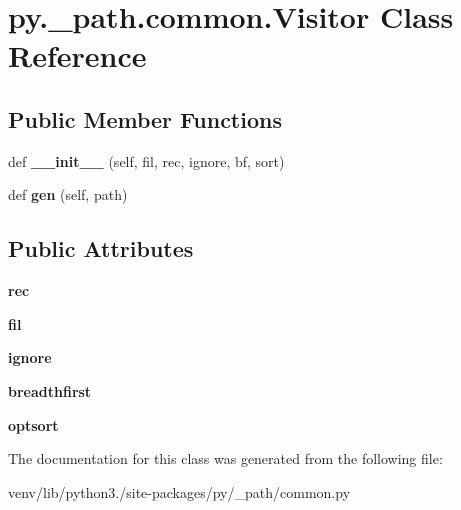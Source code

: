 \hypertarget{classpy_1_1__path_1_1common_1_1_visitor}{}\section{py.\+\_\+path.\+common.\+Visitor Class Reference}
\label{classpy_1_1__path_1_1common_1_1_visitor}
\subsection*{Public Member Functions}
\begin{DoxyCompactItemize}
\item 
\mbox{\label{classpy_1_1__path_1_1common_1_1_visitor_a28ecc230ca28f21857080714a5255c93}} 
def {\bfseries \+\_\+\+\_\+init\+\_\+\+\_\+} (self, fil, rec, ignore, bf, sort)
\item 
\mbox{\label{classpy_1_1__path_1_1common_1_1_visitor_a750a06dcf7c0d9b64a192b4e8413b35b}} 
def {\bfseries gen} (self, path)
\end{DoxyCompactItemize}
\subsection*{Public Attributes}
\begin{DoxyCompactItemize}
\item 
\mbox{\label{classpy_1_1__path_1_1common_1_1_visitor_a400ff7603fa745c659383ebf4fb107e2}} 
{\bfseries rec}
\item 
\mbox{\label{classpy_1_1__path_1_1common_1_1_visitor_a40856620ba3fdca04a1e4bb8043d99da}} 
{\bfseries fil}
\item 
\mbox{\label{classpy_1_1__path_1_1common_1_1_visitor_a6fdc0541fa34f8a365660fe90b8081cf}} 
{\bfseries ignore}
\item 
\mbox{\label{classpy_1_1__path_1_1common_1_1_visitor_ab20ab09fc6e445e833bbbd0574f6ece8}} 
{\bfseries breadthfirst}
\item 
\mbox{\label{classpy_1_1__path_1_1common_1_1_visitor_a3380dbc7411ea08bbc1b67b746f2dc76}} 
{\bfseries optsort}
\end{DoxyCompactItemize}


The documentation for this class was generated from the following file\+:\begin{DoxyCompactItemize}
\item 
venv/lib/python3./site-\/packages/py/\+\_\+path/common.\+py\end{DoxyCompactItemize}
